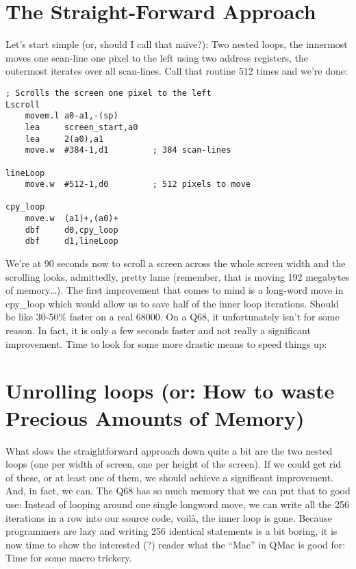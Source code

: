 \section{The Straight-Forward Approach}

Let's start simple (or, should I call that naïve?): Two nested loops,
the innermost moves one scan-line one pixel to the left using two address
registers, the outermost iterates over all scan-lines. Call that routine
512 times and we're done:

\begin{lstlisting}[firstnumber=1,caption={Scrolling one pixel leftwards}]
; Scrolls the screen one pixel to the left
Lscroll
    movem.l a0-a1,-(sp)
    lea     screen_start,a0
    lea     2(a0),a1
    move.w  #384-1,d1         ; 384 scan-lines

lineLoop
    move.w  #512-1,d0         ; 512 pixels to move
    
cpy_loop
    move.w  (a1)+,(a0)+
    dbf     d0,cpy_loop
    dbf     d1,lineLoop
\end{lstlisting}

We're at 90 seconds now to scroll a screen across the whole screen width
and the scrolling looks, admittedly, pretty lame (remember, that is
moving 192 megabytes of memory\ldots{}). The first improvement that
comes to mind is a long-word move in cpy\_loop which would allow us to
save half of the inner loop iterations. Should be like 30-50\% faster on
a real 68000. On a Q68, it unfortunately isn't for some reason. In fact,
it is only a few seconds faster and not really a significant
improvement. Time to look for some more drastic means to speed things
up:

\section{Unrolling loops (or: How to waste Precious Amounts of Memory)}

What slows the straightforward approach down quite a bit are the two
nested loops (one per width of screen, one per height of the screen). If
we could get rid of these, or at least one of them, we should achieve a
significant improvement. And, in fact, we can. The Q68 has so much
memory that we can put that to good use: Instead of looping around one
single longword move, we can write all the 256 iterations in a row into
our source code, voilà, the inner loop is gone. Because programmers are
lazy and writing 256 identical statements is a bit boring, it is now
time to show the interested (?) reader what the ``Mac'' in QMac is good
for: Time for some macro trickery.

